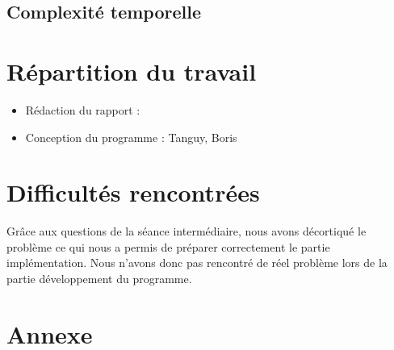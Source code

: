 \documentclass[11pt]{article}
\begin{document}
\subsection{Complexité temporelle}

\section{Répartition du travail}
\begin{itemize}
\item Rédaction du rapport : 
\item Conception du programme : Tanguy, Boris
\end{itemize}

\section{Difficultés rencontrées}
Grâce aux questions de la séance intermédiaire, nous avons décortiqué le problème ce qui nous a permis de préparer correctement le partie implémentation. Nous n'avons donc pas rencontré de réel problème lors de la partie développement du programme.
\newpage

\section{Annexe}
\begin{center}
\end{center}
\end{document}
